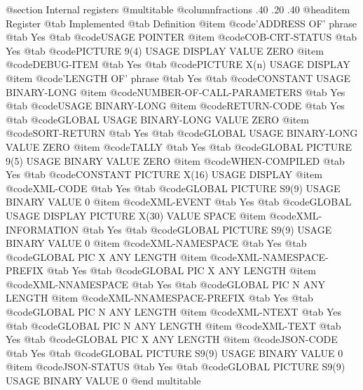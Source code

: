 @section Internal registers
@multitable @columnfractions .40 .20 .40
@headitem Register @tab Implemented @tab Definition
@item @code{'ADDRESS OF' phrase} @tab Yes @tab @code{USAGE POINTER}
@item @code{COB-CRT-STATUS} @tab Yes @tab @code{PICTURE 9(4) USAGE DISPLAY VALUE ZERO}
@item @code{DEBUG-ITEM} @tab Yes @tab @code{PICTURE X(n) USAGE DISPLAY}
@item @code{'LENGTH OF' phrase} @tab Yes @tab @code{CONSTANT USAGE BINARY-LONG}
@item @code{NUMBER-OF-CALL-PARAMETERS} @tab Yes @tab @code{USAGE BINARY-LONG}
@item @code{RETURN-CODE} @tab Yes @tab @code{GLOBAL USAGE BINARY-LONG VALUE ZERO}
@item @code{SORT-RETURN} @tab Yes @tab @code{GLOBAL USAGE BINARY-LONG VALUE ZERO}
@item @code{TALLY} @tab Yes @tab @code{GLOBAL PICTURE 9(5) USAGE BINARY VALUE ZERO}
@item @code{WHEN-COMPILED} @tab Yes @tab @code{CONSTANT PICTURE X(16) USAGE DISPLAY}
@item @code{XML-CODE} @tab Yes @tab @code{GLOBAL PICTURE S9(9) USAGE BINARY VALUE 0}
@item @code{XML-EVENT} @tab Yes @tab @code{GLOBAL USAGE DISPLAY PICTURE X(30) VALUE SPACE}
@item @code{XML-INFORMATION} @tab Yes @tab @code{GLOBAL PICTURE S9(9) USAGE BINARY VALUE 0}
@item @code{XML-NAMESPACE} @tab Yes @tab @code{GLOBAL PIC X ANY LENGTH}
@item @code{XML-NAMESPACE-PREFIX} @tab Yes @tab @code{GLOBAL PIC X ANY LENGTH}
@item @code{XML-NNAMESPACE} @tab Yes @tab @code{GLOBAL PIC N ANY LENGTH}
@item @code{XML-NNAMESPACE-PREFIX} @tab Yes @tab @code{GLOBAL PIC N ANY LENGTH}
@item @code{XML-NTEXT} @tab Yes @tab @code{GLOBAL PIC N ANY LENGTH}
@item @code{XML-TEXT} @tab Yes @tab @code{GLOBAL PIC X ANY LENGTH}
@item @code{JSON-CODE} @tab Yes @tab @code{GLOBAL PICTURE S9(9) USAGE BINARY VALUE 0}
@item @code{JSON-STATUS} @tab Yes @tab @code{GLOBAL PICTURE S9(9) USAGE BINARY VALUE 0}
@end multitable
